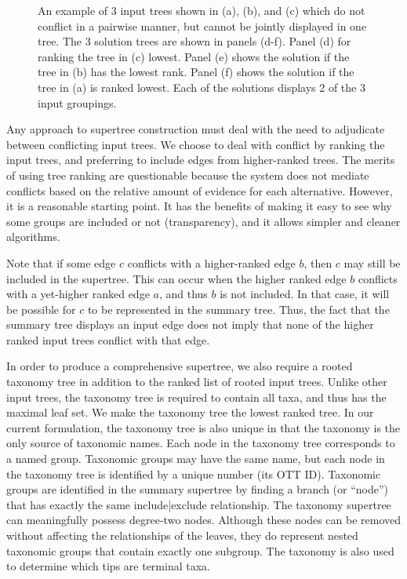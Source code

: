 \documentclass[fleqn,12pt,lineno,english]{wlpeerj}
\begin{document}
\begin{figure}
{}

\caption{An example of 3 input trees shown in (a), (b), and (c) which do not
conflict in a pairwise manner, but cannot be jointly displayed in
one tree. The 3 solution trees are shown in panels (d-f). Panel (d)
for ranking the tree in (c) lowest. Panel (e) shows the solution if
the tree in (b) has the lowest rank. Panel (f) shows the solution
if the tree in (a) is ranked lowest. Each of the solutions displays
2 of the 3 input groupings. }

\label{fig:pairwisecompat}
\end{figure}

Any approach to supertree construction must deal with the need to
adjudicate between conflicting input trees. We choose to deal with
conflict by ranking the input trees, and preferring to include edges
from higher-ranked trees. The merits of using tree ranking are questionable
because the system does not mediate conflicts based on the relative
amount of evidence for each alternative. However, it is a reasonable
starting point. It has the benefits of making it easy to see why some
groups are included or not (transparency), and it allows simpler and
cleaner algorithms.

Note that if some edge $c$ conflicts with a higher-ranked edge $b$,
then $c$ may still be included in the supertree. This can occur when
the higher ranked edge $b$ conflicts with a yet-higher ranked edge
$a$, and thus $b$ is not included. In that case, it will be possible
for $c$ to be represented in the summary tree. Thus, the fact that
the summary tree displays an input edge does not imply that none of
the higher ranked input trees conflict with that edge. 

In order to produce a comprehensive supertree, we also require a rooted
taxonomy tree in addition to the ranked list of rooted input trees.
Unlike other input trees, the taxonomy tree is required to contain
all taxa, and thus has the maximal leaf set. We make the taxonomy
tree the lowest ranked tree. In our current formulation, the taxonomy
tree is also unique in that the taxonomy is the only source of taxonomic
names. Each node in the taxonomy tree corresponds to a named group.
Taxonomic groups may have the same name, but each node in the taxonomy
tree is identified by a unique number (its OTT ID). Taxonomic groups
are identified in the summary supertree by finding a branch (or ``node'')
that has exactly the same include|exclude relationship. The taxonomy
supertree can meaningfully possess degree-two nodes. Although these
nodes can be removed without affecting the relationships of the leaves,
they do represent nested taxonomic groups that contain exactly one
subgroup. The taxonomy is also used to determine which tips are terminal
taxa.
\end{document}
